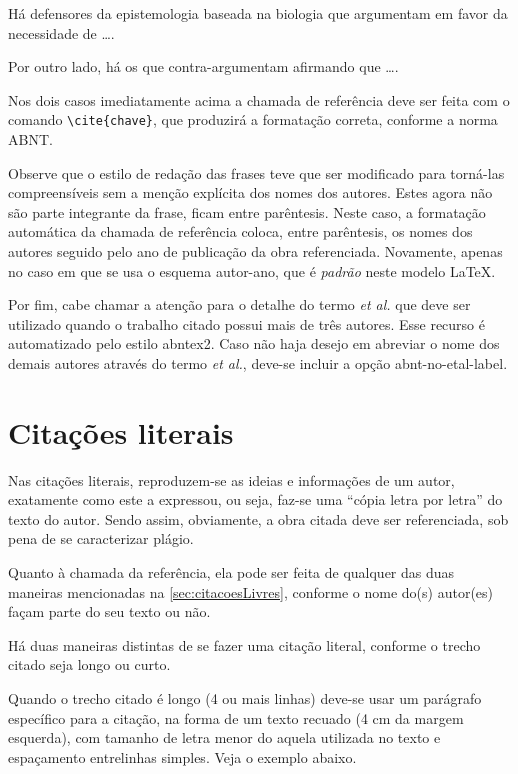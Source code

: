 \begin{apendicesenv}
Há defensores da epistemologia baseada na biologia que argumentam em favor da necessidade de \ldots \cite{Maturana2003}.

Por outro lado, há os que contra-argumentam afirmando que \ldots  \cite{Barbosa2004}.

Nos dois casos imediatamente acima a chamada de referência deve ser feita com o comando \verb|\cite{chave}|, que produzirá a formatação correta, conforme a norma ABNT.

Observe que o estilo de redação das frases teve que ser modificado para torná-las compreensíveis sem a menção explícita dos nomes dos autores. Estes agora não são parte integrante da frase, ficam entre parêntesis. Neste caso, a formatação automática da chamada de referência coloca, entre parêntesis, os nomes dos autores seguido pelo ano de publicação da obra referenciada. Novamente, apenas no caso em que se usa o esquema autor-ano, que é \textit{padrão} neste modelo \LaTeX{}.

Por fim, cabe chamar a atenção para o detalhe do termo \textit{et al.} que deve ser utilizado quando o trabalho citado possui mais de três autores. Esse recurso é automatizado pelo estilo {\ttfamily abntex2}. Caso não haja desejo em abreviar o nome dos demais autores através do termo \textit{et al.}, deve-se incluir a opção {\ttfamily abnt-no-etal-label}.

\section{Citações literais}
\label{sec:citacoesLiterais}

Nas citações literais, reproduzem-se as ideias e informações de um autor, exatamente como este a expressou, ou seja, faz-se uma ``cópia letra por letra'' do texto do autor. Sendo assim, obviamente, a obra citada deve ser referenciada, sob pena de se caracterizar plágio.

Quanto à chamada da referência, ela pode ser feita de qualquer das duas maneiras mencionadas na \autoref{sec:citacoesLivres}, conforme o nome do(s) autor(es) façam parte do seu texto ou não.

Há duas maneiras distintas de se fazer uma citação literal, conforme o trecho citado seja longo ou curto.

Quando o trecho citado é longo (4 ou mais linhas) deve-se usar um parágrafo específico para a citação, na forma de um texto recuado (4 cm da margem esquerda), com tamanho de letra menor do aquela utilizada no texto e espaçamento entrelinhas simples. Veja o exemplo abaixo.


\end{apendicesenv}
